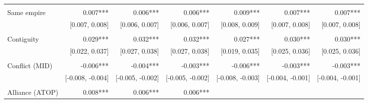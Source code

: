 \begin{table}[!h]
\begin{tabular}{lllllll}
  \multicolumn{1}{r}{} \\
\multicolumn{1}{l}{Same empire} &
  \multicolumn{1}{|r}{0.007***} &
  \multicolumn{1}{r}{0.006***} &
  \multicolumn{1}{r}{0.006***} &
  \multicolumn{1}{r}{0.009***} &
  \multicolumn{1}{r}{0.007***} &
  \multicolumn{1}{r}{0.007***} \\
\multicolumn{1}{l}{} &
  \multicolumn{1}{|r}{[0.007,   0.008]} &
  \multicolumn{1}{r}{[0.006,   0.007]} &
  \multicolumn{1}{r}{[0.006,   0.007]} &
  \multicolumn{1}{r}{[0.008,   0.009]} &
  \multicolumn{1}{r}{[0.007,   0.008]} &
  \multicolumn{1}{r}{[0.007,   0.008]} \\
\multicolumn{1}{l}{} &
  \multicolumn{1}{|r}{} &
  \multicolumn{1}{r}{} &
  \multicolumn{1}{r}{} &
  \multicolumn{1}{r}{} &
  \multicolumn{1}{r}{} &
  \multicolumn{1}{r}{} \\
\multicolumn{1}{l}{Contiguity} &
  \multicolumn{1}{|r}{0.029***} &
  \multicolumn{1}{r}{0.032***} &
  \multicolumn{1}{r}{0.032***} &
  \multicolumn{1}{r}{0.027***} &
  \multicolumn{1}{r}{0.030***} &
  \multicolumn{1}{r}{0.030***} \\
\multicolumn{1}{l}{} &
  \multicolumn{1}{|r}{[0.022,   0.037]} &
  \multicolumn{1}{r}{[0.027,   0.038]} &
  \multicolumn{1}{r}{[0.027,   0.038]} &
  \multicolumn{1}{r}{[0.019,   0.035]} &
  \multicolumn{1}{r}{[0.025,   0.036]} &
  \multicolumn{1}{r}{[0.025,   0.036]} \\
\multicolumn{1}{l}{} &
  \multicolumn{1}{|r}{} &
  \multicolumn{1}{r}{} &
  \multicolumn{1}{r}{} &
  \multicolumn{1}{r}{} &
  \multicolumn{1}{r}{} &
  \multicolumn{1}{r}{} \\
\multicolumn{1}{l}{Conflict (MID)} &
  \multicolumn{1}{|r}{-0.006***} &
  \multicolumn{1}{r}{-0.004***} &
  \multicolumn{1}{r}{-0.003***} &
  \multicolumn{1}{r}{-0.006***} &
  \multicolumn{1}{r}{-0.003***} &
  \multicolumn{1}{r}{-0.003***} \\
\multicolumn{1}{l}{} &
  \multicolumn{1}{|r}{[-0.008,  -0.004]} &
  \multicolumn{1}{r}{[-0.005,  -0.002]} &
  \multicolumn{1}{r}{[-0.005,  -0.002]} &
  \multicolumn{1}{r}{[-0.008,  -0.003]} &
  \multicolumn{1}{r}{[-0.004,  -0.001]} &
  \multicolumn{1}{r}{[-0.004,  -0.001]} \\
\multicolumn{1}{l}{} &
  \multicolumn{1}{|r}{} &
  \multicolumn{1}{r}{} &
  \multicolumn{1}{r}{} &
  \multicolumn{1}{r}{} &
  \multicolumn{1}{r}{} &
  \multicolumn{1}{r}{} \\
\multicolumn{1}{l}{Alliance (ATOP)} &
  \multicolumn{1}{|r}{0.008***} &
  \multicolumn{1}{r}{0.006***} &
  \multicolumn{1}{r}{0.006***} &

\end{tabular}
\end{table}

